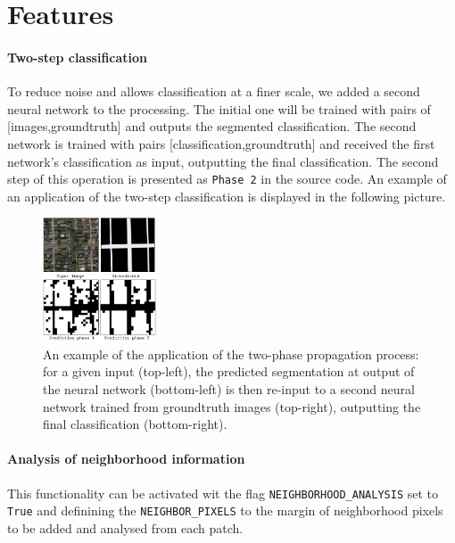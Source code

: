 \documentclass[fleqn,9 pt]{SelfArx} %
\begin{document}
\begin{sloppypar}
\section{Features}

\paragraph{Two-step classification} 

To reduce noise and allows classification at a finer scale, we added a second neural network to the processing. The initial one will be trained with pairs of [images,groundtruth] and outputs the segmented classification. The second network is trained with pairs [classification,groundtruth] and received the first network's classification as input, outputting the final classification. The second step of this operation is presented as \texttt{Phase 2} in the source code. An example of an application of the two-step classification is displayed in the following picture.

\begin{figure}[H]
\centering
\includegraphics[width=0.3\textwidth]{figures/two_phases_conv2d.pdf}
\caption{\small An example of the application of the two-phase propagation process: for a given input (top-left), the predicted segmentation at output of the neural network (bottom-left) is then re-input to a second neural network trained from groundtruth images (top-right), outputting the final classification (bottom-right).}
\end{figure}

\paragraph{Analysis of neighborhood information} This functionality can be activated wit the flag \texttt{NEIGHBORHOOD\_ANALYSIS} set to \texttt{True} and definining the \texttt{NEIGHBOR\_PIXELS} to the margin of neighborhood pixels to be added and analysed from each patch.


\end{sloppypar}
\end{document}

